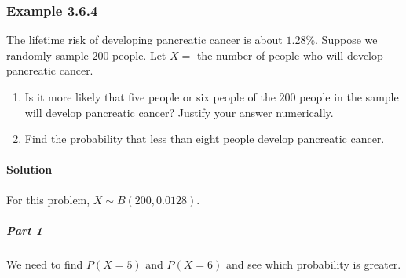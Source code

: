\documentclass[letterpaper,10pt,english]{jupyterBook}
\begin{document}
\subsubsection{Example 3.6.4}
\label{\detokenize{Ch3 Probability/3.6 The Binomial Distribution:example-3-6-4}}
\sphinxAtStartPar
The lifetime risk of developing pancreatic cancer is about \(1.28\%\). Suppose we randomly sample \(200\) people. Let \(X =\) the number of people who will develop pancreatic cancer.
\begin{enumerate}
%
\item {} 
\sphinxAtStartPar
Is it more likely that five people or six people of the \(200\) people in the sample will develop pancreatic cancer? Justify your answer numerically.

\item {} 
\sphinxAtStartPar
Find the probability that less than eight people develop pancreatic cancer.

\end{enumerate}


\paragraph{Solution}
\label{\detokenize{Ch3 Probability/3.6 The Binomial Distribution:id7}}
\sphinxAtStartPar
For this problem, \(X \sim B(200, 0.0128)\).


\subparagraph{Part 1}
\label{\detokenize{Ch3 Probability/3.6 The Binomial Distribution:id8}}
\sphinxAtStartPar
We need to find \(P(X = 5)\) and \(P(X = 6)\) and see which probability is greater.
\end{document}
